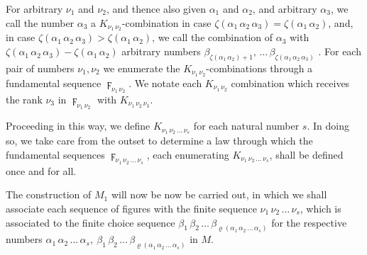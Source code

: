 \documentclass{amsart}
\newcommand\Rank[1]{\varrho\left(#1\right)}
\newcommand\Max[1]{\zeta\left(#1\right)}
\begin{document}
For arbitrary $\nu_1$ and $\nu_2$, and thence also given $\alpha_1$ and
$\alpha_2$, and arbitrary $\alpha_3$, we call the number $\alpha_3$ a
$K_{\nu_1\,\nu_2}$-combination in case $\Max{\alpha_1\,\alpha_2\,\alpha_3} =
\Max{\alpha_1\,\alpha_2}$, and, in case $\Max{\alpha_1\,\alpha_2\,\alpha_3} >
\Max{\alpha_1\,\alpha_2}$, we  call the combination of
$\alpha_3$ with $\Max{\alpha_1\,\alpha_2\,\alpha_3} - \Max{\alpha_1\,\alpha_2}$
arbitrary numbers $\beta_{\Max{\alpha_1\,\alpha_2} +
1},\,\dots\,\beta_{\Max{\alpha_1\,\alpha_2\,\alpha_3}}$ . For each pair of numbers $\nu_1, \nu_2$ we
enumerate the $K_{\nu_1\,\nu_2}$-combinations through a fundamental sequence
$\digamma_{\nu_1\,\nu_2}$. We notate each $K_{\nu_1\,\nu_2}$ combination which
receives the rank $\nu_3$ in $\digamma_{\nu_1\,\nu_2}$ with
$K_{\nu_1\,\nu_2\,\nu_3}$.

Proceeding in this way, we define $K_{\nu_1\,\nu_2\,\dots\,\nu_s}$ for each natural
number $s$. In doing so, we take care from the outset to determine a
law through which the fundamental sequences $\digamma_{\nu_1\,\nu_2\,\dots\,\nu_s}$,
each enumerating $K_{\nu_1\,\nu_2\,\dots\,\nu_s}$, shall be defined once and for all.

The construction of $M_1$ will now be now be carried out, in which we shall
associate each sequence of figures with the finite sequence
$\nu_1\,\nu_2\,\dots\,\nu_s$, which is associated to the finite choice sequence
$\beta_1\,\beta_2\,\dots\,\beta_{\Rank{\alpha_1\,\alpha_2\,\dots\,\alpha_s}}$ for the
respective numbers $\alpha_1\,\alpha_2\,\dots\,\alpha_s,\
\beta_1\,\beta_2\,\dots\,\beta_{\Rank{\alpha_1\,\alpha_2\,\dots\,\alpha_s}}$ in $M$.

\bigskip
\end{document}
